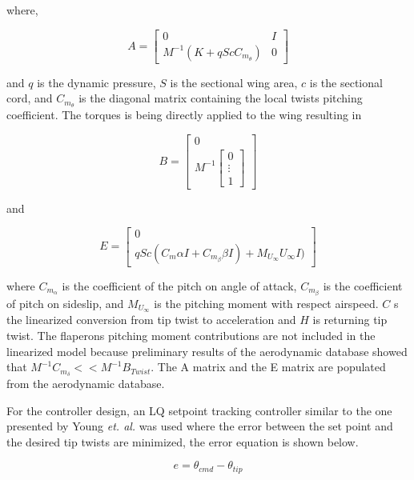 \documentclass[11pt]{ucthesis}
\begin{document}
where,

\begin{equation}
A = \begin{bmatrix}
0&I\\
M^{-1}(K+qScC_{m_{\theta}})&0
\end{bmatrix}
\end{equation}

and $q$ is the dynamic pressure, $S$ is the sectional wing area, $c$ is the sectional cord, and $C_{m_{\theta}}$ is the diagonal matrix containing the local twists pitching coefficient. The torques is being directly applied to the wing resulting in 

\begin{equation}
B = \begin{bmatrix}
0\\
M^{-1}\begin{bmatrix}
0\\\vdots\\1\end{bmatrix}
\end{bmatrix}
\end{equation}

and

\begin{equation}
E = \begin{bmatrix}
0\\
qSc(C_m\alpha I+C_{m_{\beta}}\beta I)+M_{U_{\infty}}U_{\infty}I)
\end{bmatrix}
\end{equation}

where $C_{m_{\alpha}}$ is the coefficient of the pitch on angle of attack, $C_{m_{\beta}}$ is the coefficient of pitch on sideslip, and $M_{U_{\infty}}$ is the pitching moment with respect airspeed. $C$ s the linearized conversion from tip twist to acceleration and $H$ is returning tip twist. The flaperons pitching moment contributions are not included in the linearized model because preliminary results of the aerodynamic database showed that $M^{-1}C_{m_{\delta}}<<M^{-1}B_{Twist}$. The A matrix and the E matrix are populated from the aerodynamic database.

For the controller design, an LQ setpoint tracking controller similar to the one presented by Young \textit{et. al.}\cite{young1972approach}  was used where the error between the set point and the desired tip twists are minimized, the error equation is shown below.

\begin{equation}
e = \theta_{cmd}-\theta_{tip}
\end{equation}
\end{document}
